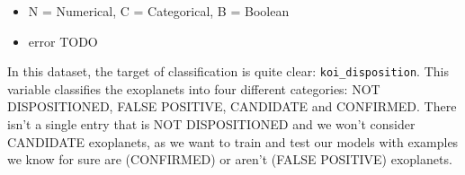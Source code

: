 \begin{itemize}[noitemsep,nolistsep]
  \item[\dagger] N = Numerical, C = Categorical, B = Boolean
  \item[\ddag] error TODO
\end{itemize}


In this dataset, the target of classification is quite clear:
\texttt{koi\_disposition}. This variable classifies the exoplanets into
four different categories: NOT DISPOSITIONED, FALSE POSITIVE, CANDIDATE and
CONFIRMED. There isn't a single entry that is NOT DISPOSITIONED and we won't 
consider CANDIDATE exoplanets, as we want to train and test our models with
examples we know for sure are (CONFIRMED) or aren't (FALSE POSITIVE) exoplanets.